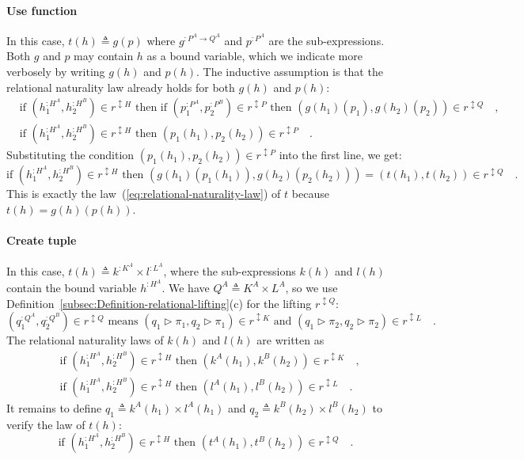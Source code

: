 \paragraph{Use function}

In this case, $t(h)\triangleq g(p)$ where $g^{:P^{A}\rightarrow Q^{A}}$
and $p^{:P^{A}}$ are the sub-expressions. Both $g$ and $p$ may
contain $h$ as a bound variable, which we indicate more verbosely
by writing $g(h)$ and $p(h)$. The inductive assumption is that the
relational naturality law already holds for both $g(h)$ and $p(h)$:
\begin{align*}
 & \text{if }(h_{1}^{:H^{A}},h_{2}^{:H^{B}})\in r^{\updownarrow H}\text{ then if }(p_{1}^{:P^{A}},p_{2}^{:P^{B}})\in r^{\updownarrow P}\text{ then }(g(h_{1})(p_{1}),g(h_{2})(p_{2}))\in r^{\updownarrow Q}\quad,\\
 & \text{if }(h_{1}^{:H^{A}},h_{2}^{:H^{B}})\in r^{\updownarrow H}\text{ then }(p_{1}(h_{1}),p_{2}(h_{2}))\in r^{\updownarrow P}\quad.
\end{align*}
Substituting the condition $(p_{1}(h_{1}),p_{2}(h_{2}))\in r^{\updownarrow P}$
into the first line, we get:
\[
\text{if }(h_{1}^{:H^{A}},h_{2}^{:H^{B}})\in r^{\updownarrow H}\text{ then }(g(h_{1})(p_{1}(h_{1})),g(h_{2})(p_{2}(h_{2})))=(t(h_{1}),t(h_{2}))\in r^{\updownarrow Q}\quad.
\]
This is exactly the law~(\ref{eq:relational-naturality-law}) of
$t$ because $t(h)=g(h)(p(h))$.

\paragraph{Create tuple}

In this case, $t(h)\triangleq k^{:K^{A}}\times l^{:L^{A}}$, where
the sub-expressions $k(h)$ and $l(h)$ contain the bound variable
$h^{:H^{A}}$. We have $Q^{A}\triangleq K^{A}\times L^{A}$, so we
use Definition~\ref{subsec:Definition-relational-lifting}(c) for
the lifting $r^{\updownarrow Q}$:
\[
(q_{1}^{:Q^{A}},q_{2}^{:Q^{B}})\in r^{\updownarrow Q}\text{ means }(q_{1}\triangleright\pi_{1},q_{2}\triangleright\pi_{1})\in r^{\updownarrow K}\text{ and }(q_{1}\triangleright\pi_{2},q_{2}\triangleright\pi_{2})\in r^{\updownarrow L}\quad.
\]
The relational naturality laws of $k(h)$ and $l(h)$ are written
as
\begin{align*}
 & \text{if }(h_{1}^{:H^{A}},h_{2}^{:H^{B}})\in r^{\updownarrow H}\text{ then }(k^{A}(h_{1}),k^{B}(h_{2}))\in r^{\updownarrow K}\quad,\\
 & \text{if }(h_{1}^{:H^{A}},h_{2}^{:H^{B}})\in r^{\updownarrow H}\text{ then }(l^{A}(h_{1}),l^{B}(h_{2}))\in r^{\updownarrow L}\quad.
\end{align*}
It remains to define $q_{1}\triangleq k^{A}(h_{1})\times l^{A}(h_{1})$
and $q_{2}\triangleq k^{B}(h_{2})\times l^{B}(h_{2})$ to verify the
law of $t(h)$:
\[
\text{if }(h_{1}^{:H^{A}},h_{2}^{:H^{B}})\in r^{\updownarrow H}\text{ then }(t^{A}(h_{1}),t^{B}(h_{2}))\in r^{\updownarrow Q}\quad.
\]


